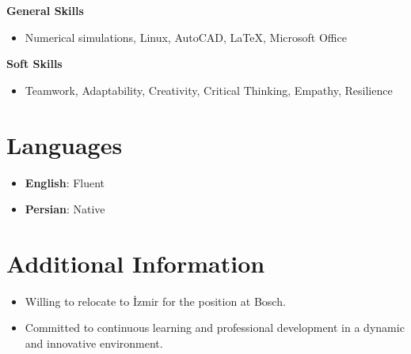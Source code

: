 \documentclass[a4paper,10pt]{article}
\begin{document}
\textbf{General Skills}
\begin{itemize}[noitemsep,topsep=0pt,parsep=0pt,partopsep=0pt]
    \item Numerical simulations, Linux, AutoCAD, LaTeX, Microsoft Office
\end{itemize}

\textbf{Soft Skills}
\begin{itemize}[noitemsep,topsep=0pt,parsep=0pt,partopsep=0pt]
    \item Teamwork, Adaptability, Creativity, Critical Thinking, Empathy, Resilience
\end{itemize}

\section{Languages}
\begin{itemize}[noitemsep,topsep=0pt,parsep=0pt,partopsep=0pt]
    \item \textbf{English}: Fluent
    \item \textbf{Persian}: Native
\end{itemize}

\section{Additional Information}
\begin{itemize}[noitemsep,topsep=0pt,parsep=0pt,partopsep=0pt]
    \item Willing to relocate to İzmir for the position at Bosch.
    \item Committed to continuous learning and professional development in a dynamic and innovative environment.
\end{itemize}
\end{document}
